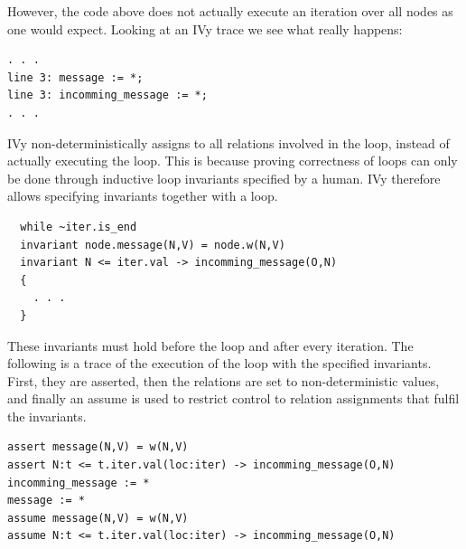 \documentclass[fleqn]{article}
\begin{document}
\noindent However, the code above does not actually execute an iteration over all nodes as one would expect. Looking at an IVy trace we see what really happens:

\begin{mdframed}[nobreak=true, backgroundcolor=light-gray, roundcorner=10pt,leftmargin=1, rightmargin=1, innerleftmargin=15, innertopmargin=15,innerbottommargin=15, outerlinewidth=1, linecolor=light-gray]
\begin{lstlisting}
. . .
line 3: message := *;
line 3: incomming_message := *;
. . .
\end{lstlisting}
\end{mdframed}

IVy non-deterministically assigns to all relations involved in the loop, instead of actually executing the loop.  This is because proving correctness of loops can only be done through inductive loop invariants specified by a human. IVy therefore allows specifying invariants together with a loop.
\begin{mdframed}[nobreak=true, backgroundcolor=light-gray, roundcorner=10pt,leftmargin=1, rightmargin=1, innerleftmargin=15, innertopmargin=15,innerbottommargin=15, outerlinewidth=1, linecolor=light-gray]
\begin{lstlisting}
  while ~iter.is_end
  invariant node.message(N,V) = node.w(N,V)
  invariant N <= iter.val -> incomming_message(O,N)
  {
    . . .
  }
\end{lstlisting}
\end{mdframed}

These invariants must hold before the loop and after every iteration. The following is a trace of the execution of the loop with the specified invariants. First, they are asserted, then the relations are set to non-deterministic values, and finally an assume is used to restrict control to relation assignments that fulfil the invariants.

\begin{mdframed}[nobreak=true, backgroundcolor=light-gray, roundcorner=10pt,leftmargin=1, rightmargin=1, innerleftmargin=15, innertopmargin=15,innerbottommargin=15, outerlinewidth=1, linecolor=light-gray]
\begin{lstlisting}
assert message(N,V) = w(N,V)
assert N:t <= t.iter.val(loc:iter) -> incomming_message(O,N)
incomming_message := *
message := *
assume message(N,V) = w(N,V)
assume N:t <= t.iter.val(loc:iter) -> incomming_message(O,N)
\end{lstlisting}
\end{mdframed}
\end{document}
